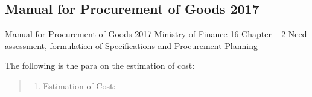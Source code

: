 \documentclass[
  11pt,
  twoside]{article}
\providecommand{\tightlist}{%
  \setlength{\itemsep}{0pt}\setlength{\parskip}{0pt}}
\begin{document}
\hypertarget{manual-for-procurement-of-goods-2017}{%
\subsection{Manual for Procurement of Goods 2017}\label{manual-for-procurement-of-goods-2017}}

Manual for Procurement of Goods 2017 Ministry of Finance 16 Chapter -- 2 Need assessment, formulation of Specifications and Procurement Planning

The following is the para on the estimation of cost:

\begin{quote}
\begin{enumerate}
\def\labelenumi{\alph{enumi})}
\setcounter{enumi}{4}
\tightlist
\item
  Estimation of Cost:
\end{enumerate}
\end{quote}
\end{document}
